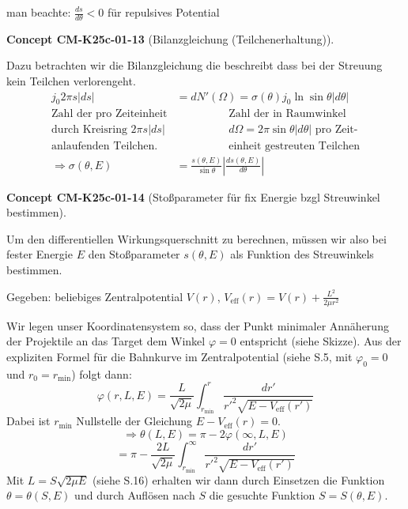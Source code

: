\documentclass[10pt, letterpaper]{article}
\newcommand{\CustomHeading}[3]{%
  \par\medskip\noindent%
  \textbf{#1 #2} \textnormal{(#3)}.\enskip%
}
\newenvironment{CONC}[2]{\begin{unitbox}\CustomHeading{Concept}{#1}{#2}}{\end{unitbox}}
\begin{document}
\begin{center}
\end{center}

man beachte: $\frac{ds}{d\theta} < 0$ für repulsives Potential

\begin{CONC}{CM-K25c-01-13}{Bilanzgleichung (Teilchenerhaltung)}
Dazu betrachten wir die Bilanzgleichung die beschreibt dass bei der Streuung kein Teilchen verlorengeht.
$$
\begin{aligned}
j_0 2 \pi s|d s| &= dN'(\Omega) = \sigma(\theta) j_0 \ln \sin \theta|d \theta| \\
\text{Zahl der pro Zeiteinheit} & \hspace{2cm} \text{Zahl der in Raumwinkel} \\
\text{durch Kreisring } 2\pi s|ds| & \hspace{2cm} d\Omega=2\pi\sin\theta |d\theta| \text{ pro Zeit-} \\
\text{anlaufenden Teilchen.} & \hspace{2cm} \text{einheit gestreuten Teilchen} \\[1ex]
\Rightarrow \sigma(\theta,E) &= \frac{s(\theta,E)}{\sin\theta} \left|\frac{ds(\theta,E)}{d\theta}\right|
\end{aligned}
$$
\end{CONC}


\begin{CONC}{CM-K25c-01-14}{Stoßparameter für fix Energie bzgl Streuwinkel bestimmen}
Um den differentiellen Wirkungsquerschnitt zu berechnen, müssen wir also bei fester Energie $E$ den Stoßparameter $s(\theta,E)$ als Funktion des Streuwinkels bestimmen.

Gegeben: beliebiges Zentralpotential $V(r)$, $V_{\text{eff}}(r)=V(r)+\frac{L^2}{2\mu r^2}$

Wir legen unser Koordinatensystem so, dass der Punkt minimaler Annäherung der Projektile an das Target dem Winkel $\varphi=0$ entspricht (siehe Skizze). Aus der expliziten Formel für die Bahnkurve im Zentralpotential (siehe S.5, mit $\varphi_0=0$ und $r_0=r_{\text{min}}$) folgt dann:
\[ \varphi(r,L,E)= \frac{L}{\sqrt{2\mu}} \int_{r_{\text{min}}}^r \frac{dr'}{r'^2\sqrt{E-V_{\text{eff}}(r')}} \]
Dabei ist $r_{\text{min}}$ Nullstelle der Gleichung $E-V_{\text{eff}}(r)=0$.
\[ \Rightarrow \theta(L,E) = \pi - 2\varphi(\infty,L,E) \]
\[ = \pi - \frac{2L}{\sqrt{2\mu}} \int_{r_{\text{min}}}^\infty \frac{dr'}{r'^2\sqrt{E-V_{\text{eff}}(r')}} \]
Mit $L = S\sqrt{2\mu E}$ (siehe S.16) erhalten wir dann durch Einsetzen die Funktion $\theta = \theta(S,E)$ und durch Auflösen nach $S$ die gesuchte Funktion $S=S(\theta,E)$.
\end{CONC}
\end{document}
